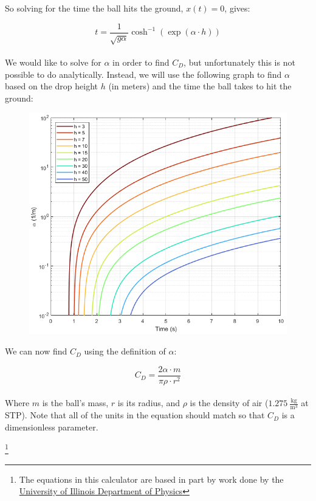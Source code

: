 \documentclass[a4paper]{article}
\newcommand\blfootnote[1]{%
	\begingroup
	\renewcommand\thefootnote{}\footnote{#1}%
	\addtocounter{footnote}{-1}%
	\endgroup
}
\begin{document}
	So solving for the time the ball hits the ground, $ x(t) = 0 $, gives:
	
	\begin{equation}
		t = \frac{1}{\sqrt{g \alpha}} \cosh^{-1} \left( \exp \left( \alpha \cdot h \right) \right)
	\end{equation}\\
	
	We would like to solve for $ \alpha $ in order to find $ C_D $, but unfortunately this is not possible to do analytically. Instead, we will use the following graph to find $ \alpha $ based on the drop height $ h $ (in meters) and the time the ball takes to hit the ground:
	
	\begin{figure}[H]
		\centering
		\includegraphics[width=\linewidth]{projectile_drag}
	\end{figure}
	
	We can now find $ C_D $ using the definition of $ \alpha $:
	
	\begin{equation}
		C_D = \frac{2\alpha \cdot m}{\pi \rho \cdot r^2}
	\end{equation}\\
	
	Where $ m $ is the ball's mass, $ r $ is its radius, and $ \rho $ is the density of air ($ 1.275\ \frac{\text{kg}}{\text{m}^3} $ at STP). Note that all of the units in the equation should match so that $ C_D $ is a dimensionless parameter.
	
	
	\blfootnote{The equations in this calculator are based in part by work done by the \href{http://baseball.physics.illinois.edu/ajpfeb08.pdf}{University of Illinois Department of Physics}}
	
	
	
\end{document}

